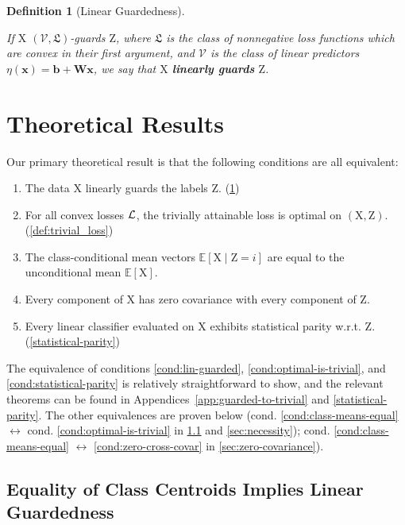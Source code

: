 \documentclass{article}
\theoremstyle{plain}
\newtheorem{definition}[theorem]{Definition}
\theoremstyle{remark}
\newcommand{\E}{\mathbb E}
\let\iff\leftrightarrow
\theoremstyle{plain}
\theoremstyle{TheoremNum}
\newcommand{\rv}[1]{{\mathrm{#1}}}
\newcommand{\loss}{\color{black} \mathcal{L}}
\begin{document}
\begin{definition}[Linear Guardedness]\label{def:linear-guardedness}

If $\rv X$ $(\mathcal V, \mathfrak L)$-guards $\rv Z$, where $\mathfrak L$ is the class of nonnegative loss functions which are convex in their first argument, and $\mathcal V$ is the class of linear predictors $\eta(\mathbf{x}) = \mathbf b + \mathbf{W}\mathbf{x}$, we say that $\rv X$ \textbf{linearly guards} $\rv Z$.
\end{definition}

\section{Theoretical Results}
\label{sec:theorems}

Our primary theoretical result is that the following conditions are all equivalent:
\begin{enumerate}
    \item \label{cond:lin-guarded} The data $\rv X$ linearly guards the labels $\rv Z$. (\cref{def:linear-guardedness})
    \item \label{cond:optimal-is-trivial} For all convex losses $\loss$, the trivially attainable loss is optimal on $(\rv X, \rv Z)$. (\cref{def:trivial_loss})
    \item \label{cond:class-means-equal} The class-conditional mean vectors $\E[\rv X \mid \rv Z = i]$ are equal to the unconditional mean $\E[\rv X]$.
    \item \label{cond:zero-cross-covar} Every component of $\rv X$ has zero covariance with every component of $\rv Z$.
    \item \label{cond:statistical-parity} Every linear classifier evaluated on $\rv X$ exhibits statistical parity w.r.t. $\rv Z$. (\cref{statistical-parity})
\end{enumerate}
The equivalence of conditions \ref{cond:lin-guarded}, \ref{cond:optimal-is-trivial}, and \ref{cond:statistical-parity} is relatively straightforward to show, and the relevant theorems can be found in Appendices~\ref{app:guarded-to-trivial} and \ref{statistical-parity}. The other equivalences are proven below (cond. \ref{cond:class-means-equal} $\iff$ cond. \ref{cond:optimal-is-trivial} in \cref{sec:equality-sufficient} and \cref{sec:necessity}); cond. \ref{cond:class-means-equal} $\iff$ \ref{cond:zero-cross-covar} in \cref{sec:zero-covariance}).

\subsection{Equality of Class Centroids Implies Linear Guardedness}\label{sec:equality-sufficient}
\end{document}
